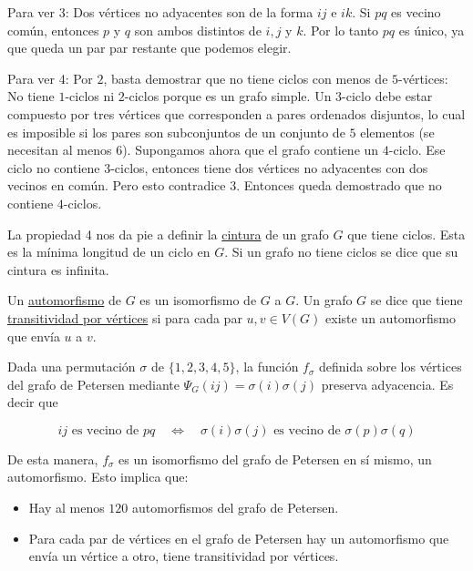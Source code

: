 \begin{ejer}
    Para ver 3: Dos vértices no adyacentes son de la forma $ij$ e $ik$. Si $pq$ es vecino común, entonces $p$ y $q$ son ambos distintos de $i, j$ y $k$. Por lo tanto $pq$ es único, ya que queda un par par restante que podemos elegir.
    
    Para ver 4: Por $2$, basta demostrar que no tiene ciclos con menos de $5$-vértices: No tiene $1$-ciclos ni $2$-ciclos porque es un grafo simple. Un $3$-ciclo debe estar compuesto por tres vértices que corresponden a pares ordenados disjuntos, lo cual es imposible si los pares son subconjuntos de un conjunto de $5$ elementos (se necesitan al menos $6$). Supongamos ahora que el grafo contiene un $4$-ciclo. Ese ciclo no contiene $3$-ciclos, entonces tiene dos vértices no adyacentes con dos vecinos en común. Pero esto contradice 3. Entonces queda demostrado que no contiene $4$-ciclos.
\end{ejer}

\begin{defn}
    La propiedad 4 nos da pie a definir la \ul{cintura} de un grafo $G$ que tiene ciclos. Esta es la mínima longitud de un ciclo en $G$. Si un grafo no tiene ciclos se dice que su cintura es infinita.
\end{defn}

\begin{defn}
    Un \ul{automorfismo} de $G$ es un isomorfismo de $G$ a $G$. Un grafo $G$ se dice que tiene \ul{transitividad por vértices} si para cada par $u, v \in V(G)$ existe un automorfismo que envía $u$ a $v$.
\end{defn}

\begin{ejem}
    Dada una permutación $\sigma$ de $\{1,2,3,4,5\}$, la función $f_{\sigma}$ definida sobre los vértices del grafo de Petersen mediante $\Psi_{G}(ij) = \sigma(i)\sigma(j)$ preserva adyacencia. Es decir que
    
    \[
    \text{$ij$ es vecino de $pq$} \quad \iff \quad \text{$\sigma(i)\sigma(j)$ es vecino de $\sigma(p)\sigma(q)$}
    \]
    
    De esta manera, $f_{\sigma}$ es un isomorfismo del grafo de Petersen en sí mismo, un automorfismo. Esto implica que:
    
    \begin{itemize}
        \item Hay al menos $120$ automorfismos del grafo de Petersen.
        \item Para cada par de vértices en el grafo de Petersen hay un automorfismo que envía un vértice a otro, tiene transitividad por vértices.
    \end{itemize}
\end{ejem}

